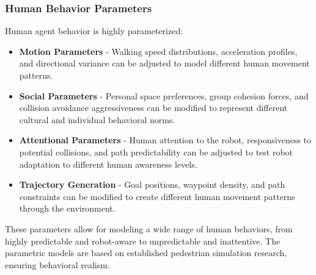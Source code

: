 \subsubsection{Human Behavior Parameters}
Human agent behavior is highly parameterized:
\begin{itemize}
    \item \textbf{Motion Parameters} - Walking speed distributions, acceleration 
    profiles, and directional variance can be adjusted to model different human 
    movement patterns.
    \item \textbf{Social Parameters} - Personal space preferences, group cohesion 
    forces, and collision avoidance aggressiveness can be modified to represent 
    different cultural and individual behavioral norms.
    \item \textbf{Attentional Parameters} - Human attention to the robot, 
    responsiveness to potential collisions, and path predictability can be 
    adjusted to test robot adaptation to different human awareness levels.
    \item \textbf{Trajectory Generation} - Goal positions, waypoint density, 
    and path constraints can be modified to create different human movement 
    patterns through the environment.
\end{itemize}
These parameters allow for modeling a wide range of human behaviors, from highly 
predictable and robot-aware to unpredictable and inattentive. The parametric models 
are based on established pedestrian simulation research, ensuring behavioral realism.

